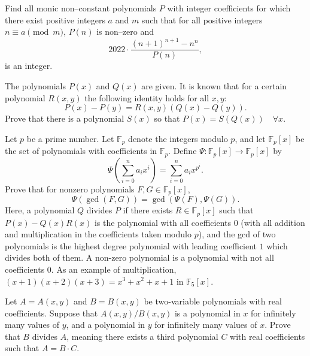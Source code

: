 \documentclass[12pt,a4paper]{memoir}
\theoremstyle{definition}
\begin{document}
\begin{question}[name={2022 ELMO}]
	Find all monic non--constant polynomials $P$ with integer coefficients for which there exist positive integers $a$ and $m$ such that for all positive integers $n\equiv a\pmod m$, $P(n)$ is non--zero and $$2022\cdot\frac{(n+1)^{n+1} - n^n}{P(n)},$$ is an integer.
\end{question}



\begin{question}[name={2004 Russia}]
	The polynomials $P(x)$ and $Q(x)$ are given. It is known that for a certain polynomial $R(x, y)$ the following identity holds for all $x,y$: \[P(x) - P(y) = R(x, y) (Q(x) - Q(y)).\] Prove that there is a polynomial $S(x)$ so that $ P(x) = S(Q(x)) \quad \forall x$.
\end{question}


\begin{question}[name={2016 USA TST}]
	Let $p$ be a prime number. Let $\mathbb F_p$ denote the integers modulo $p$, and let $\mathbb F_p[x]$ be the set of polynomials with coefficients in $\mathbb F_p$. Define $\Psi : \mathbb F_p[x] \to \mathbb F_p[x]$ by\[ \Psi\left( \sum_{i=0}^n a_i x^i \right) = \sum_{i=0}^n a_i x^{p^i}. \]Prove that for nonzero polynomials $F,G \in \mathbb F_p[x]$,\[ \Psi(\gcd(F,G)) = \gcd(\Psi(F), \Psi(G)). \]Here, a polynomial $Q$ divides $P$ if there exists $R \in \mathbb F_p[x]$ such that $P(x) - Q(x) R(x)$ is the polynomial with all coefficients $0$ (with all addition and multiplication in the coefficients taken modulo $p$), and the gcd of two polynomials is the highest degree polynomial with leading coefficient $1$ which divides both of them. A non-zero polynomial is a polynomial with not all coefficients $0$. As an example of multiplication, $(x+1)(x+2)(x+3) = x^3+x^2+x+1$ in $\mathbb F_5[x]$.
\end{question}

\begin{question}[name={2016 USA TSTST}]
	Let $A = A(x,y)$ and $B = B(x,y)$ be two-variable polynomials with real coefficients. Suppose that $A(x,y)/B(x,y)$ is a polynomial in $x$ for infinitely many values of $y$, and a polynomial in $y$ for infinitely many values of $x$. Prove that $B$ divides $A$, meaning there exists a third polynomial $C$ with real coefficients such that $A = B \cdot C$.
\end{question}
\end{document}
